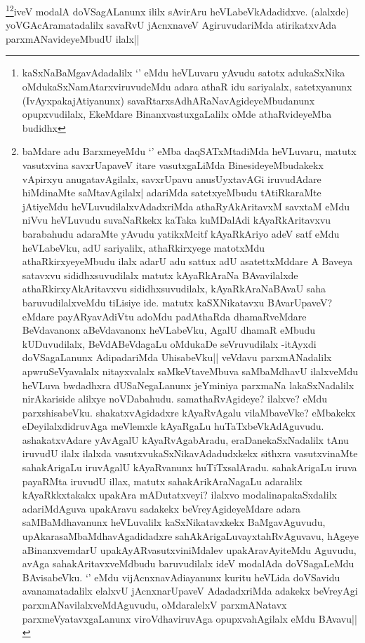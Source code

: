 \begin{artha}
\footnote{kaSxNaBaMgavAdadalilx `\stext' eMdu heVLuvaru yAvudu satotx adukaSxNika oMdukaSxNamAtarxviruvudeMdu adara athaR idu sariyalalx, satetxyanunx (IvAyxpakajAtiyanunx) savaRtarxsAdhARaNavAgideyeMbudanunx opupxvudilalx, EkeMdare BinanxvastuxgaLalilx oMde athaRvideyeMba budidhx}\footnote{baMdare adu BarxmeyeMdu `\stext' eMba daqSATxMtadiMda heVLuvaru, matutx vasutxvina savxrUapaveV itare vasutxgaLiMda BinesideyeMbudakekx vApirxyu anugatavAgilalx, savxrUpavu anusUyxtavAGi iruvudAdare hiMdinaMte saMtavAgilalx| adariMda satetxyeMbudu tAtiRkaraMte jAtiyeMdu heVLuvudilalxvAdadxriMda athaRyAkAritavxM savxtaM eMdu niVvu heVLuvudu suvaNaRkekx kaTaka kuMDalAdi kAyaRkAritavxvu barabahudu adaraMte yAvudu yatikxMcitf kAyaRkAriyo adeV satf eMdu heVLabeVku, adU sariyalilx, athaRkirxyege matotxMdu athaRkirxyeyeMbudu ilalx adarU adu sattux adU asatettxMddare A Baveya satavxvu sididhxsuvudilalx matutx kAyaRkAraNa BAvavilalxde athaRkirxyAkAritavxvu sididhxsuvudilalx, kAyaRkAraNaBAvaU saha baruvudilalxveMdu tiLisiye ide. matutx kaSXNikatavxu BAvarUpaveV? eMdare payARyavAdiVtu adoMdu padAthaRda dhamaRveMdare BeVdavanonx aBeVdavanonx heVLabeVku, AgalU dhamaR eMbudu kUDuvudilalx, BeVdABeVdagaLu oMdukaDe seVruvudilalx -itAyxdi doVSagaLanunx AdipadariMda UhisabeVku|| veVdavu parxmANadalilx apwruSeVyavalalx nitayxvalalx saMkeVtaveMbuva saMbaMdhavU ilalxveMdu heVLuva bwdadhxra dUSaNegaLanunx jeYminiya parxmaNa lakaSxNadalilx nirAkariside alilxye noVDabahudu. samathaRvAgideye? ilalxve? eMdu parxshisabeVku. shakatxvAgidadxre kAyaRvAgalu vilaMbaveVke? eMbakekx eDeyilalxdidruvAga meVlemxle kAyaRgaLu huTaTxbeVkAdAguvudu. ashakatxvAdare yAvAgalU kAyaRvAgabAradu, eraDanekaSxNadalilx tAnu iruvudU ilalx ilalxda vasutxvukaSxNikavAdadudxkekx sithxra vasutxvinaMte sahakArigaLu iruvAgalU kAyaRvanunx huTiTxsalAradu. sahakArigaLu iruva payaRMta iruvudU illax, matutx sahakArikAraNagaLu adaralilx kAyaRkkxtakakx upakAra mADutatxveyi? ilalxvo modalinapakaSxdalilx adariMdAguva upakAravu sadakekx beVreyAgideyeMdare adara saMBaMdhavanunx heVLuvalilx kaSxNikatavxkekx BaMgavAguvudu, upAkarasaMbaMdhavAgadidadxre sahAkArigaLuvayxtahRvAguvavu, hAgeye aBinanxvemdarU upakAyARvasutxviniMdalev upakAravAyiteMdu Aguvudu, avAga sahakAritavxveMdbudu baruvudilalx ideV modalAda doVSagaLeMdu BAvisabeVku. `\stext' eMdu vijAcnxnavAdiayanunx kuritu heVLida doVSavidu avanamatadalilx elalxvU jAcnxnarUpaveV AdadadxriMda adakekx beVreyAgi parxmANavilalxveMdAguvudu, oMdaralelxV parxmANatavx parxmeVyatavxgaLanunx viroVdhaviruvAga opupxvahAgilalx eMdu BAvavu||}iveV modalA doVSagALanunx ililx sAvirAru heVLabeVkAdadidxve. (alalxde) yoVGAcAramatadalilx savaRvU jAcnxnaveV AgiruvudariMda atirikatxvAda parxmANavideyeMbudU ilalx||
\end{artha}

